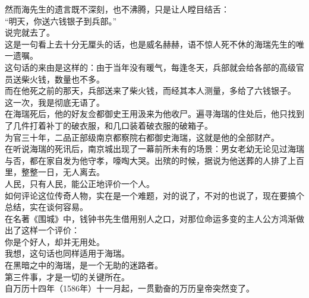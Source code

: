 \begin{multicols}{\theparacolNo}
然而海先生的遗言既不深刻，也不沸腾，只是让人瞠目结舌：\\

“明天，你送六钱银子到兵部。”\\

说完就去了。\\

这是一句看上去十分无厘头的话，也是威名赫赫，语不惊人死不休的海瑞先生的唯一遗嘱。\\

这句话的来由是这样的：由于当年没有暖气，每逢冬天，兵部就会给各部的高级官员送柴火钱，数量也不多。\\

而在他死之前的那天，兵部送来了柴火钱，而经其本人测量，多给了六钱银子。\\

这一次，我是彻底无语了。\\

在海瑞死后，他的好友佥都御史王用汲来为他收尸。遍寻海瑞的住处后，他只找到了几件打着补丁的破衣服，和几口装着破衣服的破箱子。\\

为官三十年，二品正部级南京都察院右都御史海瑞，这就是他的全部财产。\\

在听说海瑞的死讯后，南京城出现了一幕前所未有的场景：男女老幼无论见过海瑞与否，都在家自发为他守孝，嚎啕大哭。出殡的时候，据说为他送葬的人排了上百里，整整一日，无人离去。\\

人民，只有人民，能公正地评价一个人。\\

如何评论这位传奇人物，实在是一个难题，对的说了，不对的也说了，现在要搞个总结，实在谈何容易。\\

在名著《围城》中，钱钟书先生借用别人之口，对那位命运多变的主人公方鸿渐做出了这样一个评价：\\

你是个好人，却并无用处。\\

我想，这句话也同样适用于海瑞。\\

在黑暗之中的海瑞，是一个无助的迷路者。\\

第三件事，才是一切的关键所在。\\

自万历十四年（1586年）十一月起，一贯勤奋的万历皇帝突然变了。\\


\end{multicols}
